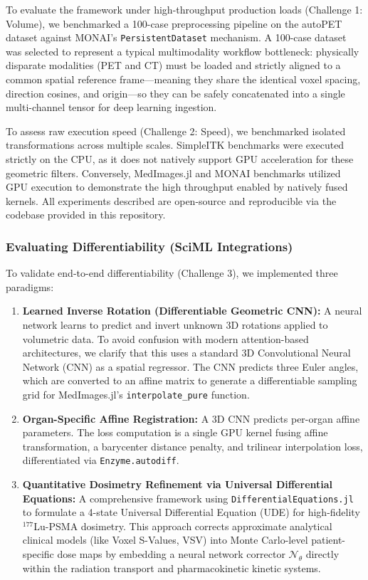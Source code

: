 \documentclass[10pt,letterpaper]{article}
\begin{document}
To evaluate the framework under high-throughput production loads (Challenge 1: Volume), we benchmarked a 100-case preprocessing pipeline on the autoPET dataset \cite{Dexl_2025} against MONAI's \texttt{PersistentDataset} mechanism. A 100-case dataset was selected to represent a typical multimodality workflow bottleneck: physically disparate modalities (PET and CT) must be loaded and strictly aligned to a common spatial reference frame---meaning they share the identical voxel spacing, direction cosines, and origin---so they can be safely concatenated into a single multi-channel tensor for deep learning ingestion. 

To assess raw execution speed (Challenge 2: Speed), we benchmarked isolated transformations across multiple scales. SimpleITK benchmarks were executed strictly on the CPU, as it does not natively support GPU acceleration for these geometric filters. Conversely, MedImages.jl and MONAI benchmarks utilized GPU execution to demonstrate the high throughput enabled by natively fused kernels. All experiments described are open-source and reproducible via the codebase provided in this repository.

\subsubsection*{Evaluating Differentiability (SciML Integrations)}
To validate end-to-end differentiability (Challenge 3), we implemented three paradigms:
\begin{enumerate}
    \item \textbf{Learned Inverse Rotation (Differentiable Geometric CNN):} A neural network learns to predict and invert unknown 3D rotations applied to volumetric data. To avoid confusion with modern attention-based architectures, we clarify that this uses a standard 3D Convolutional Neural Network (CNN) as a spatial regressor. The CNN predicts three Euler angles, which are converted to an affine matrix to generate a differentiable sampling grid for MedImages.jl's \texttt{interpolate\_pure} function. 
    \item \textbf{Organ-Specific Affine Registration:} A 3D CNN predicts per-organ affine parameters. The loss computation is a single GPU kernel fusing affine transformation, a barycenter distance penalty, and trilinear interpolation loss, differentiated via \texttt{Enzyme.autodiff}.
    \item \textbf{Quantitative Dosimetry Refinement via Universal Differential Equations:} A comprehensive framework using \texttt{DifferentialEquations.jl} \cite{Rackauckas_2017} to formulate a 4-state Universal Differential Equation (UDE) for high-fidelity $^{177}$Lu-PSMA dosimetry. This approach corrects approximate analytical clinical models (like Voxel S-Values, VSV) into Monte Carlo-level patient-specific dose maps by embedding a neural network corrector $\mathcal{N}_\theta$ directly within the radiation transport and pharmacokinetic kinetic systems.
\end{enumerate}
\end{document}
